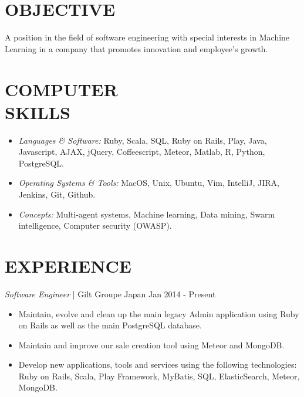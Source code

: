 \documentclass[line, margin]{res}
\begin{document}
\address{ 151-0051 Tokyo, Shibuya, Sendagaya 3-7-8 Urbanex Harajuku 605 }
\address{ abalonperin1@gmail.com | https://linkedin.com/in/abalonperin | https://github.com/zolrag13 }
 
\begin{resume}
 
\section{OBJECTIVE} A position in the field of software engineering with special interests in Machine Learning in a
company that promotes innovation and employee's growth. 
 
\section{COMPUTER \\ SKILLS}
                 \begin{itemize} %
                  \item {\sl Languages \& Software:} Ruby, Scala, SQL, Ruby on Rails, Play, Java, Javascript, AJAX, jQuery, Coffeescript, Meteor, Matlab, R, Python, PostgreSQL.
                  \item {\sl Operating Systems \& Tools:} MacOS, Unix, Ubuntu, Vim, IntelliJ, JIRA, Jenkins, Git, Github.
                  \item {\sl Concepts:} Multi-agent systems, Machine learning, Data mining, Swarm intelligence, Computer security (OWASP).
                \end{itemize}
 
\section{EXPERIENCE} {\sl Software Engineer} | Gilt Groupe Japan \hfill Jan 2014 - Present\\
                 \begin{itemize} %
                  \item  Maintain, evolve and clean up the main legacy Admin application using Ruby on Rails as well as the main PostgreSQL database.
                  \item  Maintain and improve our sale creation tool using Meteor and MongoDB.
                  \item  Develop new applications, tools and services using the following technologies: Ruby on Rails, Scala, Play Framework, MyBatis, SQL, ElasticSearch, Meteor, MongoDB.
                 \end{itemize}
 

\end{resume}
\end{document}
